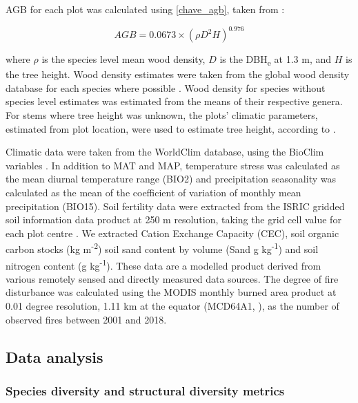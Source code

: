 \documentclass[11pt,a4paper]{article}
\begin{document}
AGB for each plot was calculated using \autoref{chave_agb}, taken from \citet{Chave2014}:

\begin{equation}
	AGB = 0.0673 \times (\rho D^{2} H)^{0.976}
	\label{chave_agb}
\end{equation}

where $\rho$ is the species level mean wood density, $D$ is the DBH\textsubscript{e} at 1.3 m, and $H$ is the tree height. Wood density estimates were taken from the global wood density database for each species where possible \citep{Chave2009, Zanne2009}. Wood density for species without species level estimates was estimated from the means of their respective genera. For stems where tree height was unknown, the plots' climatic parameters, estimated from plot location, were used to estimate tree height, according to \citet{Chave2014}.

Climatic data were taken from the WorldClim database, using the BioClim variables \citep{Fick2017}. In addition to MAT and MAP, temperature stress was calculated as the mean diurnal temperature range (BIO2) and precipitation seasonality was calculated as the mean of the coefficient of variation of monthly mean precipitation (BIO15). Soil fertility data were extracted from the ISRIC gridded soil information data product at 250 m resolution, taking the grid cell value for each plot centre \citep{Hengl2017}. We extracted Cation Exchange Capacity (CEC), soil organic carbon stocks (kg m\textsuperscript{-2}) soil sand content by volume (Sand g kg\textsuperscript{-1}) and soil nitrogen content (g kg\textsuperscript{-1}). These data are a modelled product derived from various remotely sensed and directly measured data sources. The degree of fire disturbance was calculated using the MODIS monthly burned area product at 0.01 degree resolution, 1.11 km at the equator (MCD64A1, \citealt{MODIS_burn}), as the number of observed fires between 2001 and 2018. 

\subsection{Data analysis}

\subsubsection{Species diversity and structural diversity metrics}
\end{document}

